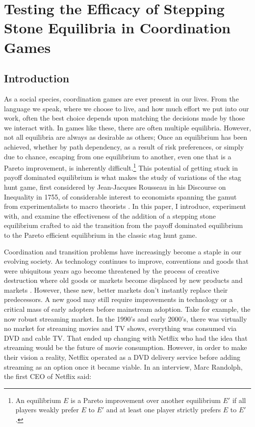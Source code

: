 \chapter{Testing the Efficacy of Stepping Stone Equilibria in Coordination Games}

\section{Introduction}

As a social species, coordination games are ever present in our lives. From the language we speak, where we choose to live, and how much effort we put into our work, often the best choice depends upon matching the decisions made by those we interact with. In games like these, there are often multiple equilibria. However, not all equilibria are always as desirable as others; Once an equilibrium has been achieved, whether by path dependency, as a result of risk preferences, or simply due to chance, escaping from one equilibrium to another, even one that is a Pareto improvement, is inherently difficult.\footnote{An equilibrium $E$ is a Pareto improvement over another equilibrium $E'$ if all players weakly prefer $E$ to $E'$ and at least one player strictly prefers $E$ to $E'$.} This potential of getting stuck in payoff dominated equilibrium is what makes the study of variations of the stag hunt game, first considered by Jean-Jacques Rousseau in his Discourse on Inequality in 1755, of considerable interest to economists spanning the gamut from experimentalists to macro theorists \citep{cooper1988coordinating, romer1996advanced, bryant1983simple}. In this paper, I introduce, experiment with, and examine the effectiveness of the addition of a stepping stone equilibrium crafted to aid the transition from the payoff dominated equilibrium to the Pareto efficient equilibrium in the classic stag hunt game.

Coordination and transition problems have increasingly become a staple in our evolving society. As technology continues to improve, conventions and goods that were ubiquitous years ago become threatened by the process of creative destruction where old goods or markets become displaced by new products and markets \citep{schumpeter2013capitalism}. However, these new, better markets don't instantly replace their predecessors. A new good may still require improvements in technology or a critical mass of early adopters before mainstream adoption. Take for example, the now robust streaming market. In the 1990's and early 2000's, there was virtually no market for streaming movies and TV shows, everything was consumed via DVD and cable TV. That ended up changing with Netflix who had the idea that streaming would be the future of movie consumption. However, in order to make their vision a reality, Netflix operated as a DVD delivery service before adding streaming as an option once it became viable. In an interview, Marc Randolph, the first CEO of Netflix said:

